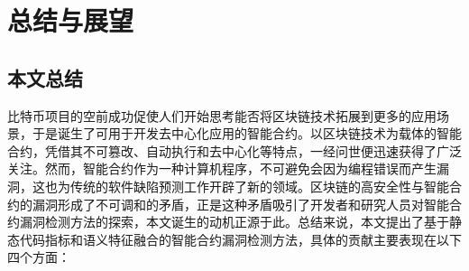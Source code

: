 \chapter{总结与展望}

\section{本文总结}
\label{sec:本文总结}
比特币项目的空前成功促使人们开始思考能否将区块链技术拓展到更多的应用场景，于是诞生了可用于开发去中心化应用的智能合约。以区块链技术为载体的智能合约，凭借其不可篡改、自动执行和去中心化等特点，一经问世便迅速获得了广泛关注。然而，智能合约作为一种计算机程序，不可避免会因为编程错误而产生漏洞，这也为传统的软件缺陷预测工作开辟了新的领域。区块链的高安全性与智能合约的漏洞形成了不可调和的矛盾，正是这种矛盾吸引了开发者和研究人员对智能合约漏洞检测方法的探索，本文诞生的动机正源于此。总结来说，本文提出了基于静态代码指标和语义特征融合的智能合约漏洞检测方法，具体的贡献主要表现在以下四个方面：
